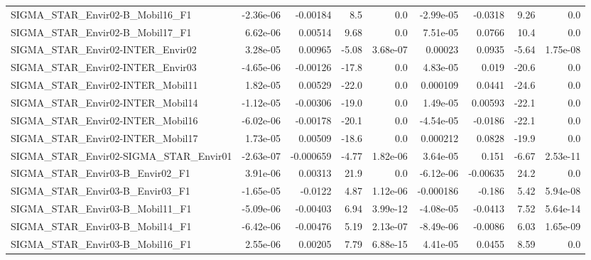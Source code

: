 \begin{tabular}{lrrrrrrrr}
SIGMA\_STAR\_Envir02-B\_Mobil16\_F1           &   -2.36e-06 &     -0.00184 &     8.5 &      0.0 &  -2.99e-05 &     -0.0318 &         9.26 &           0.0 \\
SIGMA\_STAR\_Envir02-B\_Mobil17\_F1           &    6.62e-06 &      0.00514 &    9.68 &      0.0 &   7.51e-05 &      0.0766 &         10.4 &           0.0 \\
SIGMA\_STAR\_Envir02-INTER\_Envir02          &    3.28e-05 &      0.00965 &   -5.08 & 3.68e-07 &    0.00023 &      0.0935 &        -5.64 &      1.75e-08 \\
SIGMA\_STAR\_Envir02-INTER\_Envir03          &   -4.65e-06 &     -0.00126 &   -17.8 &      0.0 &   4.83e-05 &       0.019 &        -20.6 &           0.0 \\
SIGMA\_STAR\_Envir02-INTER\_Mobil11          &    1.82e-05 &      0.00529 &   -22.0 &      0.0 &   0.000109 &      0.0441 &        -24.6 &           0.0 \\
SIGMA\_STAR\_Envir02-INTER\_Mobil14          &   -1.12e-05 &     -0.00306 &   -19.0 &      0.0 &   1.49e-05 &     0.00593 &        -22.1 &           0.0 \\
SIGMA\_STAR\_Envir02-INTER\_Mobil16          &   -6.02e-06 &     -0.00178 &   -20.1 &      0.0 &  -4.54e-05 &     -0.0186 &        -22.1 &           0.0 \\
SIGMA\_STAR\_Envir02-INTER\_Mobil17          &    1.73e-05 &      0.00509 &   -18.6 &      0.0 &   0.000212 &      0.0828 &        -19.9 &           0.0 \\
SIGMA\_STAR\_Envir02-SIGMA\_STAR\_Envir01     &   -2.63e-07 &    -0.000659 &   -4.77 & 1.82e-06 &   3.64e-05 &       0.151 &        -6.67 &      2.53e-11 \\
SIGMA\_STAR\_Envir03-B\_Envir02\_F1           &    3.91e-06 &      0.00313 &    21.9 &      0.0 &  -6.12e-06 &    -0.00635 &         24.2 &           0.0 \\
SIGMA\_STAR\_Envir03-B\_Envir03\_F1           &   -1.65e-05 &      -0.0122 &    4.87 & 1.12e-06 &  -0.000186 &      -0.186 &         5.42 &      5.94e-08 \\
SIGMA\_STAR\_Envir03-B\_Mobil11\_F1           &   -5.09e-06 &     -0.00403 &    6.94 & 3.99e-12 &  -4.08e-05 &     -0.0413 &         7.52 &      5.64e-14 \\
SIGMA\_STAR\_Envir03-B\_Mobil14\_F1           &   -6.42e-06 &     -0.00476 &    5.19 & 2.13e-07 &  -8.49e-06 &     -0.0086 &         6.03 &      1.65e-09 \\
SIGMA\_STAR\_Envir03-B\_Mobil16\_F1           &    2.55e-06 &      0.00205 &    7.79 & 6.88e-15 &   4.41e-05 &      0.0455 &         8.59 &           0.0 \\

\end{tabular}
